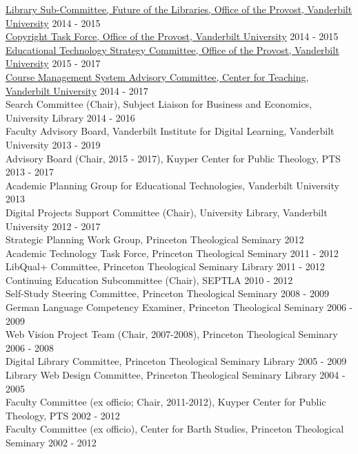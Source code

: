\documentclass[10pt]{res} %
\begin{document}
\begin{resume}
\href{https://www.library.vanderbilt.edu/future/}{Library Sub-Committee, Future of the Libraries, Office of the Provost, Vanderbilt University} \hfill 2014 - 2015 \\
\href{http://news.vanderbilt.edu/2015/09/new-videos-on-copyright-law-help-users- balance-fair-use-considerations/}{Copyright Task Force, Office of the Provost, Vanderbilt University} \hfill 2014 - 2015 \\
\href{https://www.vanderbilt.edu/provost/committees/edtechstrategy.php}{Educational Technology Strategy Committee, Office of the Provost, Vanderbilt University} \hfill 2015 - 2017 \\
\href{https://www.vanderbilt.edu/blackboard/about/advisory-committee/}{Course Management System Advisory Committee, Center for Teaching, Vanderbilt University} \hfill 2014 - 2017 \\
Search Committee (Chair), Subject Liaison for Business and Economics, University Library \hfill 2014 - 2016 \\
Faculty Advisory Board, Vanderbilt Institute for Digital Learning, Vanderbilt University \hfill 2013 - 2019 \\
Advisory Board (Chair, 2015 - 2017), Kuyper Center for Public Theology, PTS \hfill 2013 - 2017 \\
Academic Planning Group for Educational Technologies, Vanderbilt University \hfill 2013 \\
Digital Projects Support Committee (Chair), University Library, Vanderbilt University \hfill 2012 - 2017 \\
Strategic Planning Work Group, Princeton Theological Seminary \hfill 2012 \\
Academic Technology Task Force, Princeton Theological Seminary \hfill 2011 - 2012 \\
LibQual+ Committee, Princeton Theological Seminary Library \hfill 2011 - 2012 \\
Continuing Education Subcommittee (Chair), SEPTLA \hfill 2010 - 2012 \\
Self-Study Steering Committee, Princeton Theological Seminary  \hfill 2008 - 2009 \\
German Language Competency Examiner, Princeton Theological Seminary \hfill 2006 - 2009 \\
Web Vision Project Team (Chair, 2007-2008), Princeton Theological Seminary \hfill 2006 - 2008 \\
Digital Library Committee, Princeton Theological Seminary Library \hfill 2005 - 2009 \\
Library Web Design Committee, Princeton Theological Seminary Library \hfill 2004 - 2005 \\
Faculty Committee (ex officio; Chair, 2011-2012), Kuyper Center for Public Theology, PTS \hfill 2002 - 2012 \\
Faculty Committee (ex officio), Center for Barth Studies, Princeton Theological Seminary  \hfill 2002 - 2012


\end{resume}
\end{document}
